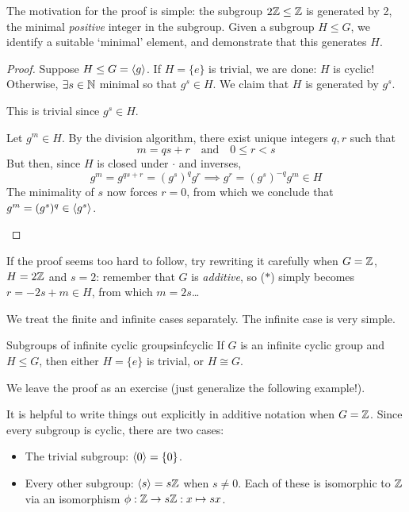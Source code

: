 The motivation for the proof is simple: the subgroup $2\mathbb{Z}\le\mathbb{Z}$ is generated by 2, the minimal \emph{positive} integer in the subgroup. Given a subgroup $H\le G$, we identify a suitable `minimal' element, and demonstrate that this generates $H$.

\begin{proof}
	Suppose $H\le G=\left\langle g\right\rangle$. If $H=\{e\}$ is trivial, we are done: $H$ is cyclic!\smallbreak
	Otherwise, $\exists s\in\mathbb{N}$ minimal so that $g^s\in H$. We claim that $H$ is generated by $g^s$.
	\begin{description}\itemsep0pt
		\item[$\bigl(\ip{g^s}\subseteq H\bigr)$] This is trivial since $g^s\in H$.
		\item[$\bigl(H\subseteq \ip{g^s}\bigr)$] Let $g^m\in H$. By the division algorithm, there exist unique integers $q,r$ such that
		\[
			m=qs+r\quad\text{and}\quad 0\le r<s
		\]
		But then, since $H$ is closed under $\cdot$ and inverses,
		\[
			g^m=g^{qs+r}=(g^s)^qg^r\implies g^r=(g^s)^{-q}g^m\in H \tag{$\ast$}
		\]
		The minimality of $s$ now forces $r=0$, from which we conclude that $g^m=(g^s)^q\in\left\langle g^s\right\rangle$.\qedhere 
	\end{description}
\end{proof}

If the proof seems too hard to follow, try rewriting it carefully when $G=\mathbb{Z}$, $H=2\mathbb{Z}$ and $s=2$: remember that $G$ is \emph{additive}, so ($\ast$) simply becomes $r=-2s+m\in H$, from which $m=2s$\ldots


\goodbreak

We treat the finite and infinite cases separately. The infinite case is very simple.

\begin{cor}{Subgroups of infinite cyclic groups}{infcyclic}
	If $G$ is an infinite cyclic group and $H\le G$, then either $H=\{e\}$ is trivial, or $H\cong G$.
\end{cor}

We leave the proof as an exercise (just generalize the following example!).

\begin{example}{}{}
	It is helpful to write things out explicitly in additive notation when $G=\mathbb{Z}$. Since every subgroup is cyclic, there are two cases:
	\begin{itemize}\itemsep2pt
	  \item The trivial subgroup: $\left\langle 0\right\rangle=\{0\}$.
	  \item Every other subgroup: $\left\langle s\right\rangle=s\mathbb{Z}$ when $s\neq 0$. Each of these is isomorphic to $\mathbb{Z}$ via an isomorphism $\phi:\mathbb{Z}\to s\mathbb{Z}:x\mapsto sx$.
	\end{itemize}
\end{example}


